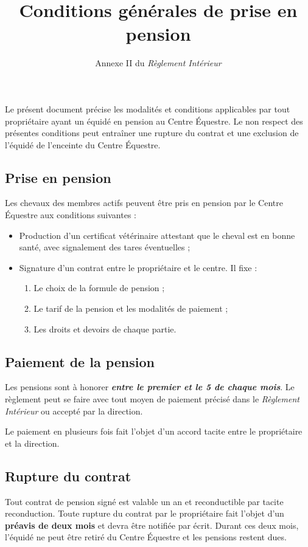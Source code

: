 \documentclass[11pt,a4paper]{article}
\title{Conditions générales de prise en pension}
\subtitle{Annexe II du \textit{Règlement Intérieur}}
\author{}
\date{}
\begin{document}
\maketitle


Le présent document précise les modalités et conditions applicables par tout propriétaire ayant un équidé en pension au Centre Équestre. Le non respect des présentes conditions peut entraîner une rupture du contrat et une exclusion de l'équidé de l'enceinte du Centre Équestre.

\subsection*{Prise en pension}
Les chevaux des membres actifs peuvent être pris en pension par le Centre Équestre aux conditions suivantes :
\begin{itemize}
\item
Production d'un certificat vétérinaire attestant que le cheval est en bonne santé, avec signalement des tares éventuelles ;
\item
Signature d'un contrat entre le propriétaire et le centre. Il fixe :
\begin{enumerate}
\item
Le choix de la formule de pension ;
\item
Le tarif de la pension et les modalités de paiement ;
\item
Les droits et devoirs de chaque partie.
\end{enumerate}
\end{itemize}

\subsection*{Paiement de la pension}
Les pensions sont à honorer \textit{\textbf{entre le premier et le 5 de chaque mois}}. Le règlement peut se faire avec tout moyen de paiement précisé dans le \textit{Règlement Intérieur} ou accepté par la direction.

Le paiement en plusieurs fois fait l'objet d'un accord tacite entre le propriétaire et la direction.

\subsection*{Rupture du contrat}
Tout contrat de pension signé est valable un an et reconductible par tacite reconduction. Toute rupture du contrat par le propriétaire fait l'objet d'un \textbf{préavis de deux mois} et devra être notifiée par écrit. Durant ces deux mois, l'équidé ne peut être retiré du Centre Équestre et les pensions restent dues.
\end{document}
